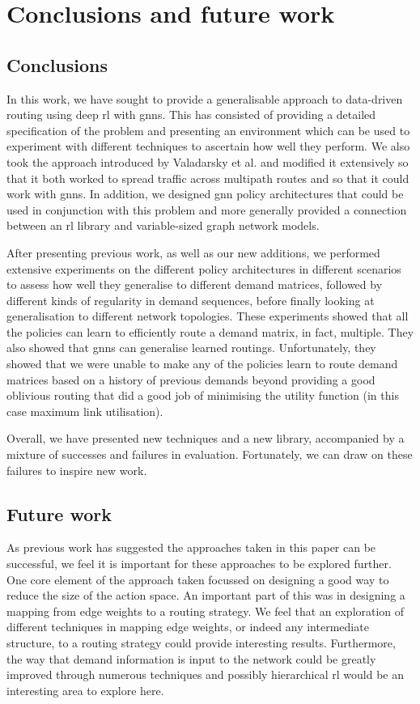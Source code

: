\chapter{Conclusions and future work}
\label{chapter:conclusions}

\section{Conclusions}
In this work, we have sought to provide a generalisable approach to data-driven routing using deep \ac{rl} with \acp{gnn}. This has consisted of providing a detailed specification of the problem and presenting an environment which can be used to experiment with different techniques to ascertain how well they perform. We also took the approach introduced by Valadarsky et al. and modified it extensively so that it both worked to spread traffic across multipath routes and so that it could work with \acp{gnn}. In addition, we designed \ac{gnn} policy architectures that could be used in conjunction with this problem and more generally provided a connection between an \ac{rl} library and variable-sized graph network models.

After presenting previous work, as well as our new additions, we performed extensive experiments on the different policy architectures in different scenarios to assess how well they generalise to different demand matrices, followed by different kinds of regularity in demand sequences, before finally looking at generalisation to different network topologies. These experiments showed that all the policies can learn to efficiently route a demand matrix, in fact, multiple. They also showed that \acp{gnn} can generalise learned routings. Unfortunately, they showed that we were unable to make any of the policies learn to route demand matrices based on a history of previous demands beyond providing a good oblivious routing that did a good job of minimising the utility function (in this case maximum link utilisation).

Overall, we have presented new techniques and a new library, accompanied by a mixture of successes and failures in evaluation. Fortunately, we can draw on these failures to inspire new work.


\section{Future work}
As previous work has suggested the approaches taken in this paper can be successful, we feel it is important for these approaches to be explored further. One core element of the approach taken focussed on designing a good way to reduce the size of the action space. An important part of this was in designing a mapping from edge weights to a routing strategy. We feel that an exploration of different techniques in mapping edge weights, or indeed any intermediate structure, to a routing strategy could provide interesting results. Furthermore, the way that demand information is input to the network could be greatly improved through numerous techniques and possibly hierarchical \ac{rl} would be an interesting area to explore here.

